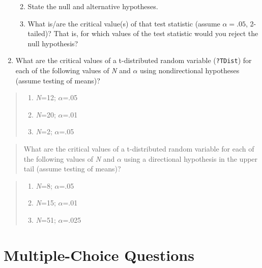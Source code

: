 \documentclass[]{article}
\providecommand{\tightlist}{%
  \setlength{\itemsep}{0pt}\setlength{\parskip}{0pt}}
\begin{document}
\begin{enumerate}
  \begin{enumerate}
  \def\labelenumii{\alph{enumii}.}
  \tightlist
  \item
    State the null and alternative hypotheses.
  \item
    What is/are the critical value(s) of that test statistic (assume
    \(\alpha = .05\), 2-tailed)? That is, for which values of the test
    statistic would you reject the null hypothesis?
  \end{enumerate}
\item
  What are the critical values of a t-distributed random variable
  (\texttt{?TDist}) for each of the following values of \emph{N} and
  \(\alpha\) using nondirectional hypotheses (assume testing of means)?
\end{enumerate}

\begin{quote}
\begin{enumerate}
\def\labelenumi{\alph{enumi}.}
\tightlist
\item
  \emph{N}=12; \(\alpha\)=.05
\item
  \emph{N}=20; \(\alpha\)=.01
\item
  \emph{N}=2; \(\alpha\)=.05
\end{enumerate}
\end{quote}

\begin{quote}
What are the critical values of a t-distributed random variable for each
of the following values of \emph{N} and \(\alpha\) using a directional
hypothesis in the upper tail (assume testing of means)?
\end{quote}

\begin{quote}
\begin{enumerate}
\def\labelenumi{\alph{enumi}.}
\setcounter{enumi}{3}
\tightlist
\item
  \emph{N}=8; \(\alpha\)=.05
\item
  \emph{N}=15; \(\alpha\)=.01
\item
  \emph{N}=51; \(\alpha\)=.025
\end{enumerate}
\end{quote}

\section{Multiple-Choice Questions}\label{multiple-choice-questions}
\end{document}
